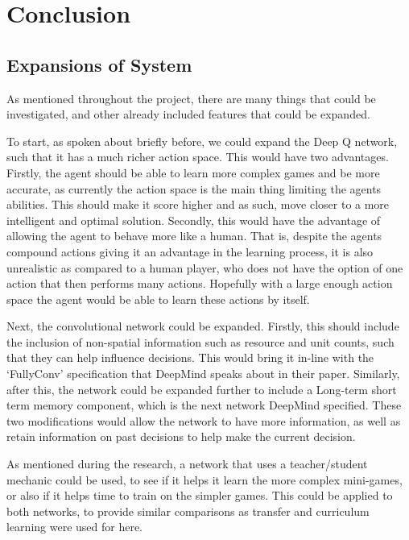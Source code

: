 \chapter{Conclusion}%
\label{conclusion}

\section{Expansions of System}

As mentioned throughout the project, there are many things that could be
investigated, and other already included features that could be expanded.

To start, as spoken about briefly before, we could expand the Deep Q network,
such that it has a much richer action space. This would have two advantages.
Firstly, the agent should be able to learn more complex games and be more
accurate, as currently the action space is the main thing limiting the agents
abilities. This should make it score higher and as such, move closer to a more
intelligent and optimal solution. Secondly, this would have the advantage of
allowing the agent to behave more like a human. That is, despite the agents
compound actions giving it an advantage in the learning process, it is also
unrealistic as compared to a human player, who does not have the option of one
action that then performs many actions. Hopefully with a large enough action
space the agent would be able to learn these actions by itself.

Next, the convolutional network could be expanded. Firstly, this should include
the inclusion of non-spatial information such as resource and unit counts, such
that they can help influence decisions. This would bring it in-line with the
`FullyConv' specification that DeepMind speaks about in their paper. Similarly,
after this, the network could be expanded further to include a Long-term short
term memory component, which is the next network DeepMind specified. These two
modifications would allow the network to have more information, as well as
retain information on past decisions to help make the current decision.

As mentioned during the research, a network that uses a teacher/student mechanic
could be used, to see if it helps it learn the more complex mini-games, or also
if it helps time to train on the simpler games. This could be applied to both
networks, to provide similar comparisons as transfer and curriculum learning were
used for here.

